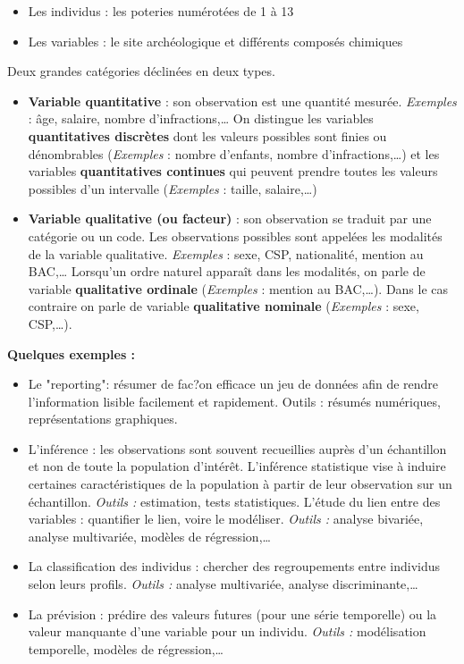 \begin{enumerate}
\begin{itemize}
\item Les individus : les poteries numérotées de 1 à 13
\item Les variables : le site archéologique et différents composés chimiques
\end{itemize}
\end{enumerate}


Deux grandes catégories déclinées en deux types.
\begin{itemize}
\item \textbf{Variable quantitative} : son observation est une quantité mesurée.\newline
\textit{Exemples} : âge, salaire, nombre d'infractions,\dots
On distingue les variables \textbf{quantitatives discrètes} dont les valeurs possibles sont finies ou dénombrables (\textit{Exemples} : nombre d'enfants, nombre d'infractions,\dots) et les variables \textbf{quantitatives continues} qui peuvent prendre toutes les valeurs possibles d'un intervalle (\textit{Exemples} : taille, salaire,\dots)
\item \textbf{Variable qualitative (ou facteur)} : son observation se traduit par une catégorie ou un code. Les observations possibles sont appelées les modalités de la variable qualitative.\newline
\textit{Exemples} : sexe, CSP, nationalité, mention au BAC,\dots
Lorsqu'un ordre naturel apparaît dans les modalités, on parle de variable \textbf{qualitative ordinale} (\textit{Exemples} : mention au BAC,\dots). Dans le cas contraire on parle de variable \textbf{qualitative nominale} (\textit{Exemples} : sexe, CSP,\dots).
\end{itemize}

\textbf{Quelques exemples :}
\begin{itemize}
\item Le "reporting": résumer de fac?on efficace un jeu de données afin de rendre l'information lisible facilement et rapidement.
Outils : résumés numériques, représentations graphiques.
\item L'inférence : les observations sont souvent recueillies auprès d'un échantillon et non de toute la population d'intérêt. L'inférence statistique vise à induire certaines caractéristiques de la population à partir de leur observation sur un échantillon.\newline
\textit{Outils :} estimation, tests statistiques.
L'étude du lien entre des variables : quantifier le lien, voire le modéliser. \newline
\textit{Outils :} analyse bivariée, analyse multivariée, modèles de régression,\dots
\item La classification des individus : chercher des regroupements entre individus selon leurs profils.\newline
\textit{Outils :} analyse multivariée, analyse discriminante,\dots
\item La prévision : prédire des valeurs futures (pour une série temporelle) ou la valeur manquante d'une variable pour un individu.\newline
\textit{Outils :} modélisation temporelle, modèles de régression,\dots
\end{itemize}

